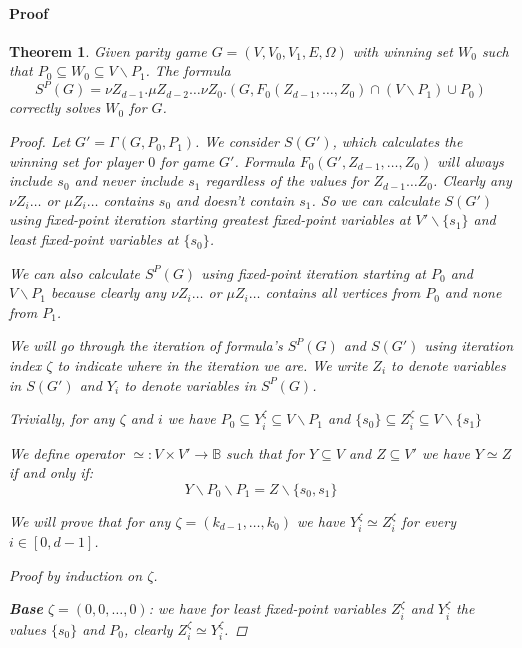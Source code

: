 \documentclass[]{article}
\newtheorem{theorem}{Theorem}[section]
\begin{document}
\paragraph{Proof}
	\begin{theorem}
		Given parity game $G = (V,V_0,V_1,E,\Omega)$ with winning set $W_0$ such that $P_0\subseteq W_0 \subseteq V\backslash P_1$. The formula 
		\[ S^P(G) = \nu Z_{d-1}.\mu Z_{d-2}\dots \nu Z_0.(G,F_0(Z_{d-1},\dots,Z_0) \cap (V\backslash P_1) \cup P_0) \]
		correctly solves $W_0$ for $G$.
		\begin{proof}
			Let $G' = \Gamma(G,P_0,P_1)$. We consider $S(G')$, which calculates the winning set for player $0$ for game $G'$. Formula $F_0(G',Z_{d-1},\dots,Z_0)$ will always include $s_0$ and never include $s_1$ regardless of the values for $Z_{d-1} \dots Z_0$. Clearly any $\nu Z_i\dots$ or $\mu Z_i\dots$ contains $s_0$ and doesn't contain $s_1$. So we can calculate $S(G')$ using fixed-point iteration starting greatest fixed-point variables at $V'\backslash \{s_1\}$ and least fixed-point variables at $\{s_0\}$.
			
			We can also calculate $S^P(G)$ using fixed-point iteration starting at $P_0$ and $V\backslash P_1$ because clearly any $\nu Z_i \dots$ or $\mu Z_i\dots$ contains all vertices from $P_0$ and none from $P_1$.
			
			We will go through the iteration of formula's $S^P(G)$ and $S(G')$ using iteration index $\zeta$ to indicate where in the iteration we are. We write $Z_i$ to denote variables in $S(G')$ and $Y_i$ to denote variables in $S^P(G)$. 
			
			Trivially, for any $\zeta$ and $i$ we have $P_0 \subseteq Y_i^{\zeta} \subseteq V\backslash P_1$ and $\{s_0\} \subseteq Z_i^\zeta\subseteq V\backslash \{s_1\}$
			
			
			We define operator $\simeq : V \times V' \rightarrow \mathbb{B}$ such that for $Y \subseteq V$ and $Z \subseteq V'$ we have $Y \simeq Z$ if and only if:
			\[ Y \backslash P_0 \backslash P_1 = Z \backslash \{s_0,s_1\}\]
			
			We will prove that for any $\zeta = (k_{d-1},\dots,k_0)$ we have $Y_i^{\zeta} \simeq Z_i^{\zeta}$ for every $i \in [0,d-1]$.
			
			Proof by induction on $\zeta$.
			
			\textbf{Base} $\zeta = (0,0,\dots,0)$: we have for least fixed-point variables $Z_i^\zeta$ and $Y_i^{\zeta}$ the values $\{s_0\}$ and $P_0$, clearly $Z_i^\zeta \simeq Y_i^{\zeta}$. 
			

\end{proof}
\end{theorem}
\end{document}

